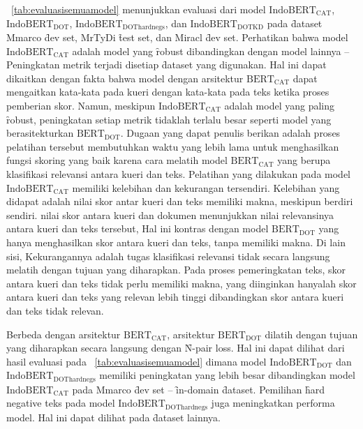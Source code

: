 \tab~\ref{tab:evaluasisemuamodel} menunjukkan evaluasi dari model $\text{IndoBERT}_{\text{CAT}}$, $\text{IndoBERT}_{\text{DOT}}$, $\text{IndoBERT}_{\text{DOThardnegs}}$, dan $\text{IndoBERT}_{\text{DOTKD}}$ pada \f{dataset} Mmarco \f{dev set}, MrTyDi \f{test set}, dan Miracl \f{dev set}. Perhatikan bahwa model $\text{IndoBERT}_{\text{CAT}}$ adalah model yang \f{robust} dibandingkan dengan model lainnya -- Peningkatan metrik terjadi disetiap \f{dataset} yang digunakan. Hal ini dapat dikaitkan dengan fakta bahwa model dengan arsitektur $\text{BERT}_{\text{CAT}}$ dapat mengaitkan kata-kata pada kueri dengan kata-kata pada teks ketika proses pemberian skor. Namun, meskipun $\text{IndoBERT}_{\text{CAT}}$ adalah model yang paling \f{robust}, peningkatan setiap metrik tidaklah terlalu besar seperti model yang berasitekturkan $\text{BERT}_{\text{DOT}}$. Dugaan yang dapat penulis berikan adalah proses pelatihan tersebut membutuhkan waktu yang lebih lama untuk menghasilkan fungsi skoring yang baik karena cara melatih model $\text{BERT}_{\text{CAT}}$ yang berupa klasifikasi relevansi antara kueri dan teks. Pelatihan yang dilakukan pada model $\text{IndoBERT}_{\text{CAT}}$ memiliki kelebihan dan kekurangan tersendiri. Kelebihan yang didapat adalah nilai skor antar kueri dan teks memiliki makna, meskipun berdiri sendiri. nilai skor antara kueri dan dokumen menunjukkan nilai relevansinya antara kueri dan teks tersebut, Hal ini kontras dengan model $\text{BERT}_{\text{DOT}}$ yang hanya menghasilkan skor antara kueri dan teks, tanpa memiliki makna. Di lain sisi, Kekurangannya adalah tugas klasifikasi relevansi tidak secara langsung melatih dengan tujuan yang diharapkan. Pada proses pemeringkatan teks, skor antara kueri dan teks tidak perlu memiliki makna, yang diinginkan hanyalah skor antara kueri dan teks yang relevan lebih tinggi dibandingkan skor antara kueri dan teks tidak relevan. 

Berbeda dengan arsitektur $\text{BERT}_{\text{CAT}}$, arsitektur $\text{BERT}_{\text{DOT}}$ dilatih dengan tujuan yang diharapkan secara langsung dengan \f{N-pair loss}. Hal ini dapat dilihat dari hasil evaluasi pada \tab~\ref{tab:evaluasisemuamodel} dimana model $\text{IndoBERT}_{\text{DOT}}$ dan $\text{IndoBERT}_{\text{DOThardnegs}}$ memiliki peningkatan yang lebih besar dibandingkan model $\text{IndoBERT}_{\text{CAT}}$ pada Mmarco \f{dev set} -- \f{in-domain} \f{dataset}. Pemilihan \f{hard negative} teks pada model $\text{IndoBERT}_{\text{DOThardnegs}}$ juga meningkatkan performa model. Hal ini dapat dilihat pada \f{dataset} lainnya.

